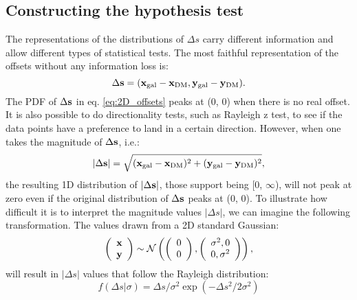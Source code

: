 \subsection{Constructing the hypothesis test} 
\label{subsec:hypothesis_test}
The representations of the distributions of $\Delta s$ carry
different information and allow different types of statistical tests. 
The most faithful representation of the offsets without any information loss
is:
\begin{equation}
	\Delta {\bf s} = ({\bf x}_{\rm gal} - {\bf x}_{\rm DM}, 
	{\bf y}_{\rm gal} - {\bf y}_{\rm DM} ).
	\label{eq:2D_offsets}
\end{equation}
The PDF of $\Delta {\bf s}$ in eq. \ref{eq:2D_offsets} peaks at (0, 0) when
there is no real offset. It is also possible to do directionality tests,
such as Rayleigh z test, to see if the data points have a preference to land in
a certain direction.
However, when one takes the magnitude of $\Delta {\bf s}$, i.e.:
\begin{equation}
	|\Delta {\bf s}| = \sqrt{({\bf x}_{\rm gal} - {\bf x}_{\rm DM})^2 + 
	({\bf y}_{\rm gal} - {\bf y}_{\rm DM})^2},
	\label{eq:magnitude_offsets}
\end{equation}
the resulting 1D distribution of $|\Delta {\bf s}|$, 
those support being [0, $\infty$),
will not peak at zero even if the original
distribution of $\Delta {\bf s}$ peaks at (0, 0). 
To illustrate how difficult it is to interpret the magnitude values $|\Delta
s|$,  
we can imagine the following transformation.
The values drawn from a 2D standard Gaussian: 
\begin{equation}
	\left(\begin{array}{c}
			\bf{x}\\
			\bf{y}
		\end{array}
	\right) \sim \mathcal{N}\left(
	\left(
		\begin{array}{c}
			0 \\
			0
		\end{array}
	\right),
	\left(\begin{array}{cc}
		\sigma^2, 0 \\
		0, \sigma^2
	 \end{array}
	\right)
\right),
\end{equation}
will result in $|\Delta s|$ values that follow the Rayleigh distribution:
\begin{equation}
	f(\Delta s | \sigma) = \Delta s /  \sigma^2 \exp(-\Delta s^2 / 2 \sigma^2)
	\label{eq:rayleigh_distro}
\end{equation}
